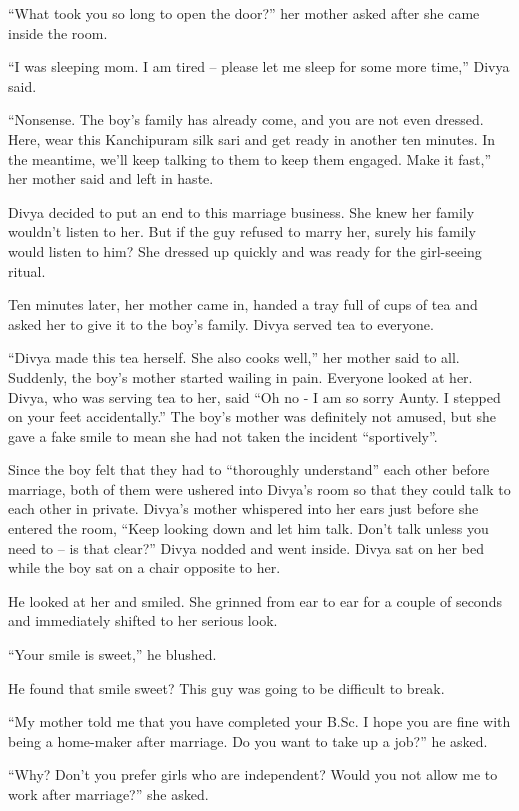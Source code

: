 “What took you so long to open the door?” her mother asked after she came inside
the room.

“I was sleeping mom. I am tired – please let me sleep for some more time,” Divya
said.

“Nonsense. The boy's family has already come, and you are not even dressed. Here,
wear this Kanchipuram silk sari and get ready in another ten minutes. In the
meantime, we'll keep talking to them to keep them engaged. Make it fast,” her
mother said and left in haste.

Divya decided to put an end to this marriage business. She knew her family
wouldn't listen to her. But if the guy refused to marry her, surely his family
would listen to him? She dressed up quickly and was ready for the girl-seeing
ritual.

Ten minutes later, her mother came in, handed a tray full of cups of tea and
asked her to give it to the boy's family. Divya served tea to everyone.

“Divya made this tea herself. She also cooks well,” her mother said to all.
Suddenly, the boy's mother started wailing in pain. Everyone looked at her.
Divya, who was serving tea to her, said “Oh no - I am so sorry Aunty. I stepped
on your feet accidentally.” The boy's mother was definitely not amused, but she
gave a fake smile to mean she had not taken the incident “sportively”.

Since the boy felt that they had to “thoroughly understand” each other before
marriage, both of them were ushered into Divya's room so that they could talk to
each other in private. Divya's mother whispered into her ears just before she
entered the room, “Keep looking down and let him talk. Don't talk unless you
need to – is that clear?” Divya nodded and went inside. Divya sat on her bed
while the boy sat on a chair opposite to her.

He looked at her and smiled. She grinned from ear to ear for a couple of seconds
and immediately shifted to her serious look.

“Your smile is sweet,” he blushed.

He found that smile sweet? This guy was going to be difficult to break.

“My mother told me that you have completed your B.Sc. I hope you are fine with
being a home-maker after marriage. Do you want to take up a job?” he asked.

“Why? Don't you prefer girls who are independent? Would you not allow me to work
after marriage?” she asked.

